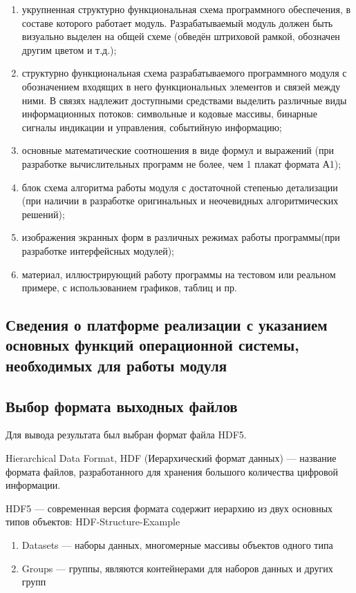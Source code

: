 \begin{enumerate}
\item  укрупненная структурно функциональная схема программного обеспечения, в составе которого работает модуль. Разрабатываемый модуль должен быть визуально выделен на общей схеме (обведён штриховой рамкой, обозначен другим цветом и т.д.);
\item  структурно функциональная схема разрабатываемого программного модуля с обозначением входящих в него функциональных элементов и связей между ними. В связях надлежит доступными средствами выделить различные виды информационных потоков: символьные и кодовые массивы, бинарные сигналы индикации и управления, событийную информацию;
\item  основные математические соотношения в виде формул и выражений (при разработке вычислительных программ не более, чем 1 плакат формата А1);
\item  блок схема алгоритма работы модуля с достаточной степенью детализации (при наличии в разработке оригинальных и неочевидных алгоритмических решений);
\item  изображения экранных форм в различных режимах работы программы(при разработке интерфейсных модулей);
\item  материал, иллюстрирующий работу программы на тестовом или реальном примере, с использованием графиков, таблиц и пр.
\end{enumerate}

\subsection{Сведения о платформе реализации с указанием основных функций операционной системы, необходимых для работы модуля}


\subsection {Выбор формата выходных файлов}
Для вывода результата был выбран формат файла HDF5. 

Hierarchical Data Format, HDF (Иерархический формат данных) — название формата файлов, разработанного для хранения большого количества цифровой информации.

HDF5 — современная версия формата содержит иерархию из двух основных типов объектов:
HDF-Structure-Example
\begin{enumerate}
\item Datasets — наборы данных, многомерные массивы объектов одного типа
\item Groups — группы, являются контейнерами для наборов данных и других групп
\end{enumerate}
    
